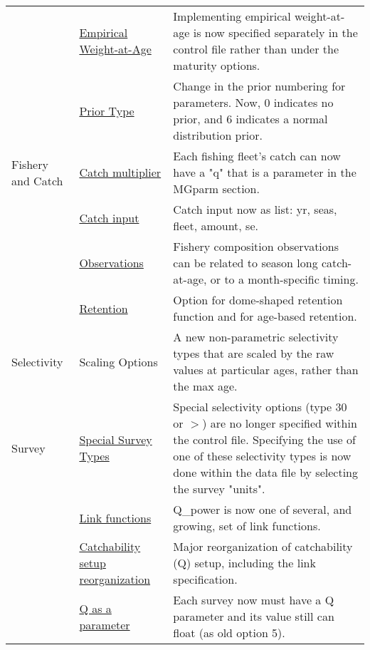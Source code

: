 \begin{center}
{\begin{longtable}{p{2cm} p{3cm} p{10cm}}
		  & \hyperlink{WAAparm} {Empirical Weight-at-Age} & Implementing empirical weight-at-age is now specified separately in the control file rather than under the maturity options.\\

		  & \hyperlink{Priors}{Prior Type} & Change in the prior numbering for parameters.  Now, 0 indicates no prior, and 6 indicates a normal distribution prior.\\

		Fishery and Catch & 
			\hyperlink{CatchMult}{Catch multiplier} & 
				Each fishing fleet's catch can now have a "q" that is a parameter in the MGparm section.\\
				
			& \hyperlink{CatchFormat}{Catch input} & 
				Catch input now as list:  yr, seas, fleet, amount, se. \\
				
			& \hyperlink{CompTiming}{Observations} & 
				Fishery composition observations can be related to season long catch-at-age, or to a month-specific timing.\\
		
			& \hyperlink{DomeRetention}{Retention} & 
				Option for dome-shaped retention function and for age-based retention. \\

		Selectivity 
			& Scaling Options & 	
				A new non-parametric selectivity types that are scaled by the raw values at particular ages, rather than the max age.\\

		Survey
			& \hyperlink{SpecialSurvey}{Special Survey Types} & 
				Special selectivity options (type 30 or $>$) are no longer specified within the control file.  Specifying the use of one of these selectivity types is now done within the data file by selecting the survey "units". \\  

			& \hyperlink{Qsetup}{Link functions} & 
				Q\_power is now one of several, and growing, set of link functions. \\
				
			& \hyperlink{Qsetup}{Catchability setup reorganization} & 
				Major reorganization of catchability (Q) setup, including the link specification. \\
			
			& \multicolumn{1}{l}{\hyperlink{Qsetup}{Q as a parameter}} & 
				Each survey now must have a Q parameter and its value still can float (as old option 5).\\


\end{longtable}}
\end{center}
